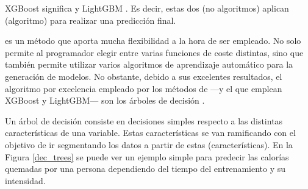 {XGBoost significa  y LightGBM . Es decir, estas dos  (no algoritmos) aplican  (algoritmo) para realizar una predicción final.

 es un método que aporta mucha flexibilidad a la hora de ser empleado. No solo permite al programador elegir entre varias funciones de coste distintas, sino que también permite utilizar varios algoritmos de aprendizaje automático para la generación de modelos. No obstante, debido a sus excelentes resultados, el algoritmo por excelencia empleado por los métodos de  ---y el que emplean XGBoost y LightGBM--- son los árboles de decisión \parencite{CARTwGBM}.

Un árbol de decisión \parencite{CART} consiste en decisiones simples  respecto a las distintas características de una variable. Estas características se van ramificando con el objetivo de ir segmentando los datos a partir de estas (características). En la Figura \ref{dec_trees} se puede ver un ejemplo simple para predecir las calorías quemadas por una persona dependiendo del tiempo del entrenamiento y su intensidad. 
\begin{figure}[H]
    \centering
\end{figure}}
